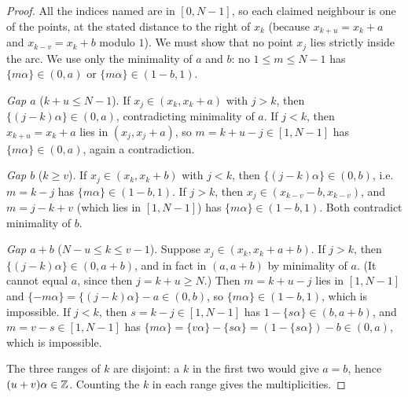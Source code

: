 \begin{proof}
All the indices named are in $[0,N-1]$, so each claimed neighbour is one of the points, at the stated
distance to the right of $x_k$ (because $x_{k+u}=x_k+a$ and $x_{k-v}=x_k+b$ modulo $1$). We must
show that no point $x_j$ lies strictly inside the arc. We use only the minimality of $a$ and $b$: no
$1\le m\le N-1$ has $\{m\alpha\}\in(0,a)$ or $\{m\alpha\}\in(1-b,1)$.

\emph{Gap $a$} ($k+u\le N-1$). If $x_j\in(x_k,x_k+a)$ with $j>k$, then $\{(j-k)\alpha\}\in(0,a)$,
contradicting minimality of $a$. If $j<k$, then $x_{k+u}=x_k+a$ lies in $(x_j,x_j+a)$, so
$m=k+u-j\in[1,N-1]$ has $\{m\alpha\}\in(0,a)$, again a contradiction.

\emph{Gap $b$} ($k\ge v$). If $x_j\in(x_k,x_k+b)$ with $j<k$, then $\{(j-k)\alpha\}\in(0,b)$, i.e.\
$m=k-j$ has $\{m\alpha\}\in(1-b,1)$. If $j>k$, then $x_j\in(x_{k-v}-b,x_{k-v})$, and $m=j-k+v$
(which lies in $[1,N-1]$) has $\{m\alpha\}\in(1-b,1)$. Both contradict minimality of $b$.

\emph{Gap $a+b$} ($N-u\le k\le v-1$). Suppose $x_j\in(x_k,x_k+a+b)$. If $j>k$, then
$\{(j-k)\alpha\}\in(0,a+b)$, and in fact in $(a,a+b)$ by minimality of $a$. (It cannot equal $a$,
since then $j=k+u\ge N$.) Then $m=k+u-j$ lies in $[1,N-1]$ and $\{-m\alpha\}=\{(j-k)\alpha\}-a\in(0,b)$, so
$\{m\alpha\}\in(1-b,1)$, which is impossible. If $j<k$, then $s=k-j\in[1,N-1]$ has
$1-\{s\alpha\}\in(b,a+b)$, and $m=v-s\in[1,N-1]$ has
$\{m\alpha\}=\{v\alpha\}-\{s\alpha\}=(1-\{s\alpha\})-b\in(0,a)$, which is impossible.

The three ranges of $k$ are disjoint: a $k$ in the first two would give $a=b$, hence
$(u+v)\alpha\in\mathbb{Z}$. Counting the $k$ in each range gives the multiplicities.
\end{proof}

